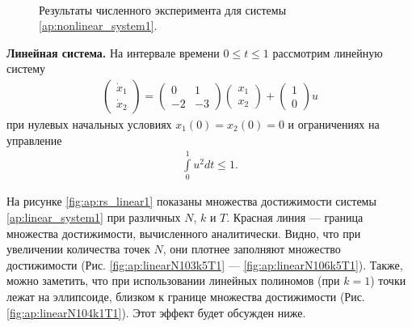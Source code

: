 \documentclass[../main.tex]{subfiles}
\begin{document}
\begin{figure}[ht!]
\begin{minipage}[b]{.3\linewidth}
  	\end{minipage} 
  	\caption{Результаты численного эксперимента для системы \eqref{ap:nonlinear_system1}.}\label{fig:ap:rs_nonlinear1}
  \end{figure}
  
  \textbf{Линейная система.} На интервале времени $ 0 \leqslant t \leqslant 1$ рассмотрим линейную систему 
  \begin{gather}\label{ap:linear_system1}
  	\begin{pmatrix} 
  		\dot{x}_1 \\
  		\dot{x}_2  
  	\end{pmatrix} = 
  	\begin{pmatrix}
  		0 & 1 \\
  		-2 & -3
  	\end{pmatrix}
  	\begin{pmatrix} 
  		x_1 \\
  		x_2  
  	\end{pmatrix} +
  	\begin{pmatrix} 1 \\ 0
  	\end{pmatrix} u
  \end{gather}
  при нулевых начальных условиях $x_1(0) = x_2(0) = 0 $ и ограничениях на управление 
  \begin{gather*}
  	\int\limits_0^1 u^2dt \leqslant 1.
  \end{gather*}
  
  На рисунке \ref{fig:ap:rs_linear1} показаны множества достижимости системы \eqref{ap:linear_system1} при различных $N$, $k$ и $T$.
  Красная линия --- граница множества достижимости, вычисленного аналитически.
  Видно, что при увеличении количества точек $N$, они плотнее заполняют множество достижимости (Рис. \ref{fig:ap:linearN103k5T1} --- \ref{fig:ap:linearN106k5T1}).  
  Также, можно заметить, что при использовании линейных полиномов (при $k = 1$)  точки лежат на эллипсоиде, близком к границе множества достижимости (Рис. \ref{fig:ap:linearN104k1T1}). 
  Этот эффект будет обсужден ниже.
  
\end{document}

